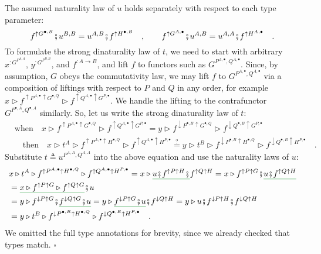 The assumed naturality law of $u$ holds separately with respect to
each type parameter:
\[
f^{\uparrow G^{\bullet,B}}\bef u^{B,B}=u^{A,B}\bef f^{\uparrow H^{\bullet,B}}\quad,\quad\quad f^{\uparrow G^{A,\bullet}}\bef u^{A,B}=u^{A,A}\bef f^{\uparrow H^{A,\bullet}}\quad.
\]
To formulate the strong dinaturality law of $t$, we need to start
with arbitrary $x^{:G^{P^{A,A}}}$, $y^{:G^{P^{B,B}}}$, and $f^{:A\rightarrow B}$,
and lift $f$ to functors such as $G^{P^{A,\bullet},Q^{A,\bullet}}$.
Since, by assumption, $G$ obeys the commutativity law, we may lift
$f$ to $G^{P^{A,\bullet},Q^{A,\bullet}}$ via a composition of liftings
with respect to $P$ and $Q$ in any order, for example $x\triangleright f^{\uparrow P^{A,\bullet}\uparrow G^{\bullet,Q}}\triangleright f^{\uparrow Q^{A,\bullet}\uparrow G^{P,\bullet}}$.
We handle the lifting to the contrafunctor $G^{P^{\bullet,A},Q^{\bullet,A}}$
similarly. So, let us write the strong dinaturality law of $t$: 
\begin{align*}
 & \text{when}\quad x\triangleright f^{\uparrow P^{A,\bullet}\uparrow G^{\bullet,Q}}\triangleright f^{\uparrow Q^{A,\bullet}\uparrow G^{P,\bullet}}=y\triangleright f^{\downarrow P^{\bullet,B}\uparrow G^{\bullet,Q}}\triangleright f^{\downarrow Q^{\bullet,B}\uparrow G^{P,\bullet}}\\
 & \quad\text{then}\quad x\triangleright t^{A}\triangleright f^{\uparrow P^{A,\bullet}\uparrow H^{\bullet,Q}}\triangleright f^{\uparrow Q^{A,\bullet}\uparrow H^{P,\bullet}}\overset{?}{=}y\triangleright t^{B}\triangleright f^{\downarrow P^{\bullet,B}\uparrow H^{\bullet,Q}}\triangleright f^{\downarrow Q^{\bullet,B}\uparrow H^{P,\bullet}}\quad.
\end{align*}
Substitute $t\triangleq u^{P^{A,A},Q^{A,A}}$ into the above equation
and use the naturality laws of $u$:
\begin{align*}
 & x\triangleright t^{A}\triangleright f^{\uparrow P^{A,\bullet}\uparrow H^{\bullet,Q}}\triangleright f^{\uparrow Q^{A,\bullet}\uparrow H^{P,\bullet}}=x\triangleright\gunderline{u\bef f^{\uparrow P\uparrow H}\bef}f^{\uparrow Q\uparrow H}=x\triangleright f^{\uparrow P\uparrow G}\bef\gunderline{u\bef f^{\uparrow Q\uparrow H}}\\
 & =\gunderline{x\triangleright f^{\uparrow P\uparrow G}\triangleright f^{\uparrow Q\uparrow G}}\bef u\\
 & =y\triangleright f^{\downarrow P\uparrow G}\bef\gunderline{f^{\downarrow Q\uparrow G}\bef u}=y\triangleright\gunderline{f^{\downarrow P\uparrow G}\bef u}\bef f^{\downarrow Q\uparrow H}=y\triangleright u\bef f^{\downarrow P\uparrow H}\bef f^{\downarrow Q\uparrow H}\\
 & =y\triangleright t^{B}\triangleright f^{\downarrow P^{\bullet,B}\uparrow H^{\bullet,Q}}\triangleright f^{\downarrow Q^{\bullet,B}\uparrow H^{P,\bullet}}\quad.
\end{align*}
We omitted the full type annotations for brevity, since we already
checked that types match. $\square$

